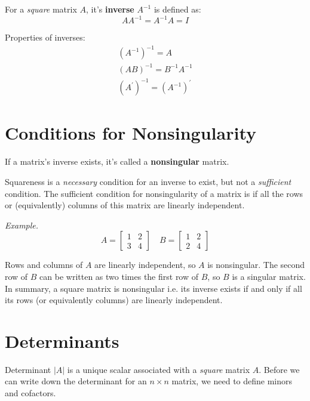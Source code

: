 \documentclass{./../../latex/handout}
\begin{document}
For a \textit{square} matrix $A$, it's \textbf{inverse} $A^{-1}$ is defined as:
\[
A A^{-1}=A^{-1} A=I
\]

Properties of inverses:
\[
\begin{array}{l}
 \left(A^{-1}\right)^{-1}=A \\
 (A B)^{-1}=B^{-1} A^{-1}  \\
\left(A^{\prime}\right)^{-1}=\left(A^{-1}\right)^{\prime} 
\end{array}
\]


\section{Conditions for Nonsingularity}

 If a matrix's inverse exists, it's called a \textbf{nonsingular} matrix. 

 Squareness is a \textit{necessary} condition for an inverse to exist, but not a \textit{sufficient} condition. The sufficient condition for nonsingularity of a matrix is if all the rows or (equivalently) columns of this matrix are linearly independent. 

\textit{Example.} \[A=\left[\begin{array}{ll}
1 & 2 \\
3 & 4
\end{array}\right]
\quad
B=\left[\begin{array}{ll}
1 & 2 \\
2 & 4
\end{array}\right]
\]

Rows and columns of $A$ are linearly independent, so $A$ is nonsingular. The second row of $B$ can be written as two times the first row of $B$, so $B$ is a singular matrix.  \\

In summary, a square matrix is nonsingular i.e. its inverse exists if and only if all its rows (or equivalently columns) are linearly independent. 


\section{Determinants}

Determinant $|A|$ is a unique scalar associated with a \textit{square} matrix $A$. Before we can write down the determinant for an $n \times n$ matrix, we need to define minors and cofactors. \\
\end{document}
